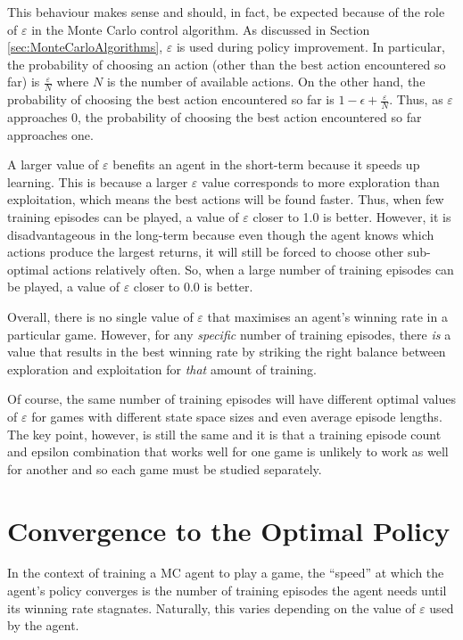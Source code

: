 \documentclass[11pt,a4paper]{report}
\begin{document}
This behaviour makes sense and should, in fact, be expected because of the role of $\varepsilon$ in the Monte Carlo control algorithm. As discussed in Section \ref{sec:MonteCarloAlgorithms}, $\varepsilon$ is used during policy improvement. In particular, the probability of choosing an action (other than the best action encountered so far) is $\frac{\varepsilon}{N}$ where $N$ is the number of available actions. On the other hand, the probability of choosing the best action encountered so far is  $1 - \epsilon + \frac{\varepsilon}{N}$. Thus, as $\varepsilon$ approaches 0, the probability of choosing the best action encountered so far approaches one.

A larger value of $\varepsilon$ benefits an agent in the short-term because it speeds up learning. This is because a larger $\varepsilon$ value corresponds to more exploration than exploitation, which means the best actions will be found faster. Thus, when few training episodes can be played, a value of $\varepsilon$ closer to 1.0 is better. However, it is disadvantageous in the long-term because even though the agent knows which actions produce the largest returns, it will still be forced to choose other sub-optimal actions relatively often. So, when a large number of training episodes can be played, a value of $\varepsilon$ closer to 0.0 is better.

Overall, there is no single value of $\varepsilon$ that maximises an agent's winning rate in a particular game. However, for any \emph{specific} number of training episodes, there \emph{is} a value that results in the best winning rate by striking the right balance between exploration and exploitation for \emph{that} amount of training.

Of course, the same number of training episodes will have different optimal values of $\varepsilon$ for games with different state space sizes and even average episode lengths. The key point, however, is still the same and it is that a training episode count and epsilon combination that works well for one game is unlikely to work as well for another and so each game must be studied separately.


\section{Convergence to the Optimal Policy}
\label{sec:convergence-results}

In the context of training a MC agent to play a game, the ``speed'' at which the agent's policy converges is the number of training episodes the agent needs until its winning rate stagnates. Naturally, this varies depending on the value of $\varepsilon$ used by the agent.
\end{document}

